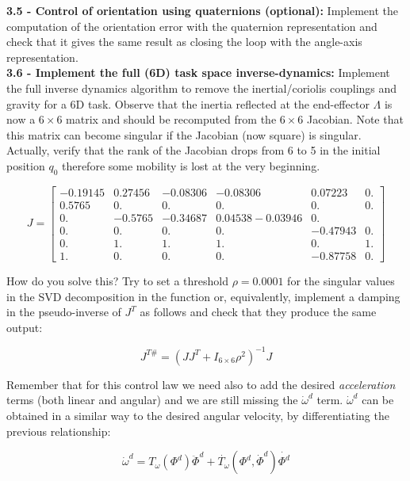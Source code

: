 \documentclass[11pt]{article}
\newcommand{\mat}[1]{\ensuremath{\begin{bmatrix}#1\end{bmatrix}}}	%
\begin{document}
\textbf{3.5 - Control of orientation using quaternions (optional):}
Implement the computation of the orientation error with the 
quaternion representation and check that it gives the same result as closing the loop with the angle-axis representation. \\


\textbf{3.6 - Implement the full (6D) task space inverse-dynamics:}
Implement the full inverse dynamics algorithm to remove the inertial/coriolis couplings and gravity for a 6D task.
Observe that the inertia reflected at the end-effector $\Lambda$ is now a $6\times6$ matrix and should be recomputed from the $6\times6$ Jacobian. Note that this matrix 
can become singular if the Jacobian (now square) is singular. 
Actually, verify that the rank of the Jacobian drops from 6 to 5 in the initial position $q_0$ therefore some mobility is lost 
at the very beginning.

 \begin{equation}
  J = \mat{-0.19145 &0.27456& -0.08306 &-0.08306 & 0.07223 & 0. \\    
  0.5765&   0.    &   0.  &     0.   &    0.  &     0.     \\
  0.    &  -0.5765 & -0.34687&  0.04538 -0.03946  &0.     \\
  0.  &     0.  &     0.    &   0. &     -0.47943 & 0.     \\
  0.  &     1.  &     1.    &   1.  &     0.      & 1.     \\
  1.  &     0.  &     0.    &   0.&      -0.87758 & 0.     }
 \end{equation}

How do you solve this? Try to set a threshold $\rho = 0.0001$ for the singular values in the 
SVD decomposition in the  function or, equivalently, implement  a damping in the pseudo-inverse of $J^T$ as follows and check that they produce the same output: 

\begin{equation}
J^{T\#} = \left(J J^T + I_{6\times 6}\rho^2\right)^{-1}J
\end{equation} 

Remember that for this control law we need also to add the desired \textit{acceleration} terms (both linear and angular) and we are still missing the $\dot{\omega}^d$ term. $\dot{\omega}^d$ can be obtained in a similar way to the desired angular velocity, by differentiating the previous relationship:

\begin{equation}
\dot{\omega}^d = T_{\omega}(\Phi^d) \ddot{\Phi}^d +  \dot{T_{\omega}}(\Phi^d,\dot{\Phi}^d ) \dot{\Phi^d}
\end{equation}
\end{document}
